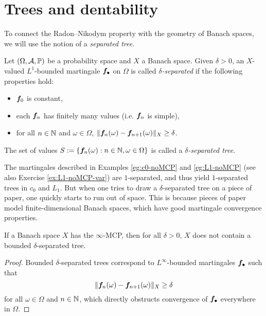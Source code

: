 \section{Trees and dentability}

To connect the Radon--Nikodym property with the geometry of Banach spaces, we will use the notion of a \emph{separated tree}.

\begin{defn}
  Let $(\Omega,\mathcal{A},\mathbb{P})$ be a probability space and $X$ a Banach space.
  Given $\delta > 0$, an $X$-valued $L^1$-bounded martingale $\bm{f}_\bullet$ on $\Omega$ is called \emph{$\delta$-separated} if the following properties hold:
  \begin{itemize}
  \item $\bm{f}_0$ is constant,
  \item each $\bm{f}_n$ has finitely many values (i.e. $\bm{f}_{n}$ is simple),
  \item for all $n \in \mathbb{N}$ and $\omega \in \Omega$, $\|\bm{f}_n(\omega) - \bm{f}_{n+1}(\omega)\|_X \geq \delta$.
  \end{itemize}
  The set of values $S := \{\bm{f}_n(\omega) : n \in \mathbb{N}, \omega \in \Omega\}$ is called a \emph{$\delta$-separated tree}.  
\end{defn}

The martingales described in Examples \ref{eg:c0-noMCP} and \ref{eg:L1-noMCP} (see also Exercise \ref{ex:L1-noMCP-var}) are $1$-separated, and thus yield $1$-separated trees in $c_0$ and $L_1$.
But when one tries to draw a $\delta$-separated tree on a piece of paper, one quickly starts to run out of space.
This is because pieces of paper model finite-dimensional Banach spaces, which have good martingale convergence properties.

\begin{prop}
  If a Banach space $X$ has the $\infty$-MCP, then for all $\delta > 0$, $X$ does not contain a bounded $\delta$-separated tree.
\end{prop}

\begin{proof}
  Bounded $\delta$-separated trees correspond to $L^\infty$-bounded martingales $\bm{f}_{\bullet}$ such that
  \begin{equation*}
    \|\bm{f}_n(\omega) - \bm{f}_{n+1}(\omega)\|_{X} \geq \delta
  \end{equation*}
  for all $\omega \in \Omega$ and $n \in \mathbb{N}$,
  which directly obstructs convergence of $\bm{f}_\bullet$ everywhere in $\Omega$.
\end{proof}

